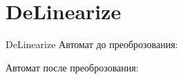 \section{DeLinearize}
\begin{frame}{DeLinearize}
	Автомат до преоброзования:


	Автомат после преоброзования:

\end{frame}
